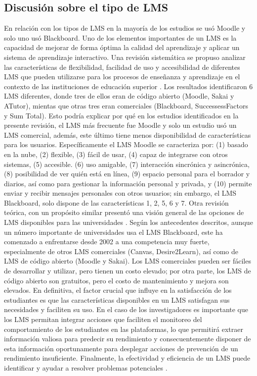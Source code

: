 \documentclass[spanish]{textolivre}
\begin{document}
\subsection*{Discusión sobre el tipo de LMS}
En relación con los tipos de LMS en la mayoría de los estudios se usó Moodle y solo uno usó Blackboard. Uno de los elementos importantes de un LMS es la capacidad de mejorar de forma óptima la calidad del aprendizaje y aplicar un sistema de aprendizaje interactivo. Una revisión sistemática se propuso analizar las características de flexibilidad, facilidad de uso y accesibilidad de diferentes LMS que pueden utilizarse para los procesos de enseñanza y aprendizaje en el contexto de las instituciones de educación superior \cite{kasim2016}. Los resultados identificaron 6 LMS diferentes, donde tres de ellos eran de código abierto (Moodle, Sakai y ATutor), mientas que otras tres eran comerciales (Blackboard, SuccessessFactors y Sum Total). Esto podría explicar por qué en los estudios identificados en la presente revisión, el LMS más frecuente fue Moodle y solo un estudio usó un LMS comercial, además, este último tiene menos disponibilidad de características para los usuarios. Específicamente el LMS Moodle se caracteriza por: (1) basado en la nube, (2) flexible, (3) fácil de usar, (4) capaz de integrarse con otros sistemas, (5) accesible. (6) uso amigable, (7) interacción sincrónica y asincrónica, (8) posibilidad de ver quién está en línea, (9) espacio personal para el borrador y diarios, así como para gestionar la información personal y privada, y (10) permite enviar y recibir mensajes personales con otros usuarios; sin embargo, el LMS Blackboard, solo dispone de las características 1, 2, 5, 6 y 7. Otra revisión teórica, con un propósito similar presentó una visión general  de las opciones de LMS disponibles para las universidades \cite{dobre2015}. Según los antecedentes descritos, aunque un número importante de universidades usa el LMS Blackboard, este ha comenzado a enfrentarse desde 2002 a una competencia muy fuerte, especialmente de otros LMS comerciales (Canvas, Desire2Learn), así como de LMS de código abierto (Moodle y Sakai). Los LMS comerciales pueden ser fáciles de desarrollar y utilizar, pero tienen un costo elevado; por otra parte, los LMS de código abierto son gratuitos, pero el costo de mantenimiento y mejora son elevados. En definitiva, el factor crucial que influye en la satisfacción de los estudiantes es que las características disponibles en un LMS satisfagan sus necesidades y faciliten su uso. En el caso de los investigadores es importante que los LMS permitan integrar acciones que faciliten el monitoreo del comportamiento de los estudiantes en las plataformas, lo que permitirá extraer información valiosa para predecir su rendimiento y consecuentemente disponer de esta información oportunamente para desplegar acciones de prevención de un rendimiento insuficiente. Finalmente, la efectividad y eficiencia de un LMS puede identificar y ayudar a resolver problemas potenciales \cite{kadir2016}.
\end{document}
